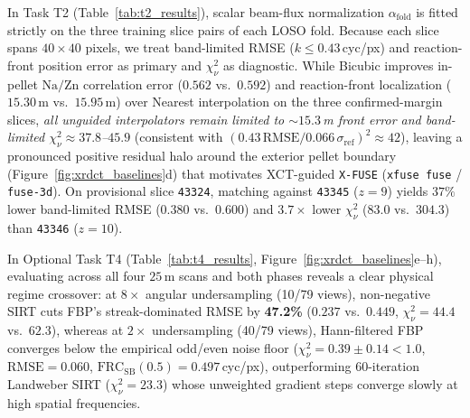 \documentclass[10pt]{article}
\begin{document}
In Task T2 (Table~\ref{tab:t2_results}), scalar beam-flux normalization $\alpha_{\mathrm{fold}}$ is fitted strictly on the three training slice pairs of each LOSO fold. Because each slice spans $40 \times 40$ pixels, we treat band-limited RMSE ($k \le 0.43$\,cyc/px) and reaction-front position error as primary and $\chi^2_\nu$ as diagnostic. While Bicubic improves in-pellet $\mathrm{Na/Zn}$ correlation error ($0.562$ vs.\ $0.592$) and reaction-front localization ($15.30$\,\textmu m vs.\ $15.95$\,\textmu m) over Nearest interpolation on the three confirmed-margin slices, \emph{all unguided interpolators remain limited to $\sim 15.3$\,\textmu m front error and band-limited $\chi^2_\nu \approx 37.8$--$45.9$} (consistent with $(0.43\,\mathrm{RMSE} / 0.066\,\sigma_{\mathrm{ref}})^2 \approx 42$), leaving a pronounced positive residual halo around the exterior pellet boundary (Figure~\ref{fig:xrdct_baselines}d) that motivates XCT-guided \texttt{X-FUSE} (\texttt{xfuse fuse} / \texttt{fuse-3d}). On provisional slice \texttt{43324}, matching against \texttt{43345} ($z{=}9$) yields $37\%$ lower band-limited RMSE ($0.380$ vs.\ $0.600$) and $3.7\times$ lower $\chi^2_\nu$ ($83.0$ vs.\ $304.3$) than \texttt{43346} ($z{=}10$).

In Optional Task T4 (Table~\ref{tab:t4_results}, Figure~\ref{fig:xrdct_baselines}e--h), evaluating across all four $25$\,\textmu m scans and both phases reveals a clear physical regime crossover: at $8\times$ angular undersampling (10/79 views), non-negative SIRT cuts FBP's streak-dominated RMSE by \textbf{47.2\%} ($0.237$ vs.\ $0.449$, $\chi^2_\nu = 44.4$ vs.\ $62.3$), whereas at $2\times$ undersampling (40/79 views), Hann-filtered FBP converges below the empirical odd/even noise floor ($\chi^2_\nu = 0.39 \pm 0.14 < 1.0$, $\mathrm{RMSE} = 0.060$, $\mathrm{FRC}_{\mathrm{SB}}(0.5) = 0.497$\,cyc/px), outperforming 60-iteration Landweber SIRT ($\chi^2_\nu = 23.3$) whose unweighted gradient steps converge slowly at high spatial frequencies.
\end{document}
